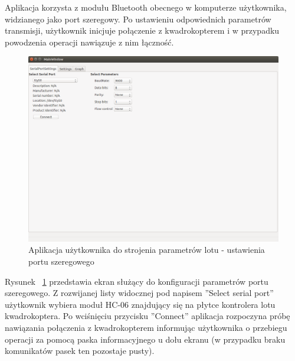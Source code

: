 Aplikacja korzysta z modułu Bluetooth obecnego w komputerze użytkownika, widzianego jako port szeregowy. Po ustawieniu odpowiednich parametrów transmisji, użytkownik inicjuje połączenie z kwadrokopterem i w przypadku powodzenia operacji nawiązuje z nim łączność. 

\begin{figure}[H]
	\centering
	\includegraphics[scale=0.4]{Pictures/QuadroTune/QuadroTuneSerialSettings.png}
	\caption[Aplikacja użytkownika do strojenia parametrów lotu - ustawienia portu szeregowego]{Aplikacja użytkownika do strojenia parametrów lotu - ustawienia portu szeregowego}
	\label{fig:QuadroTune_screen1}
\end{figure}

Rysunek ~\ref{fig:QuadroTune_screen1} przedstawia ekran służący do konfiguracji parametrów portu szeregowego. Z rozwijanej listy widocznej pod napisem ''Select serial port'' użytkownik wybiera moduł HC-06 znajdujący się na płytce kontrolera lotu kwadrokoptera. Po wciśnięciu przycisku ''Connect'' aplikacja rozpoczyna próbę nawiązania połączenia z kwadrokopterem informując użytkownika o przebiegu operacji za pomocą paska informacyjnego u dołu ekranu (w przypadku braku komunikatów pasek ten pozostaje pusty).

